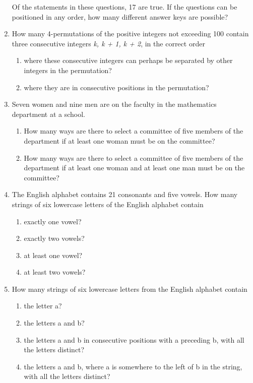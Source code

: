 \documentclass[11pt,a4paper]{book}
\newcommand{\onestaritem}{\refstepcounter{enumi}\item[$*$\theenumi.]}
\begin{document}
\begin{enumerate}
Of the statements in these questions, 17 are true.
If the questions can be positioned in any order, how many different answer keys are possible?
\onestaritem How many 4-permutations of the positive integers not exceeding 100 contain three consecutive integers \emph{k, k + 1, k + 2}, in the correct order 
\begin{enumerate}[label=(\alph*)]
\item where these consecutive integers can perhaps be separated by other integers in the permutation?
\item where they are in consecutive positions in the permutation?
\end{enumerate}
\item Seven women and nine men are on the faculty in the mathematics department at a school.
\begin{enumerate}[label=(\alph*)]
\item How many ways are there to select a committee of five members of the department if at least one woman must be on the committee?
\item How many ways are there to select a committee of five members of the department if at least one woman and at least one man must be on the committee?
\end{enumerate}
\item The English alphabet contains 21 consonants and five vowels.
How many strings of six lowercase letters of the English alphabet contain
\begin{enumerate}[label=(\alph*)]
\item exactly one vowel?
\item exactly two vowels?
\item at least one vowel?
\item at least two vowels?
\end{enumerate}
\item How many strings of six lowercase letters from the English alphabet contain
\begin{enumerate}[label=(\alph*)]
\item the letter a?
\item the letters a and b?
\item the letters a and b in consecutive positions with a preceding b, with all the letters distinct?
\item the letters a and b, where a is somewhere to the left of b in the string, with all the letters distinct?
\end{enumerate}

\end{enumerate}
\end{document}
